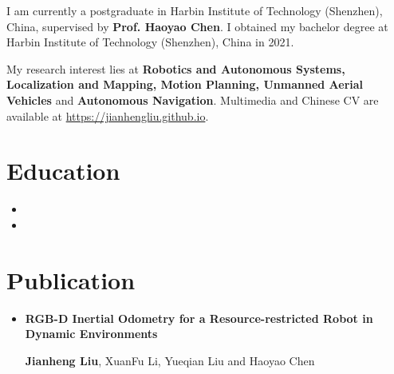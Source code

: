 \documentclass[11pt,a4paper,sans]{moderncv}        %
\begin{document}

\makecvtitle

\small{I am currently a postgraduate in Harbin Institute of Technology (Shenzhen), China, supervised by \textbf{Prof. Haoyao Chen}. I obtained my bachelor degree at Harbin Institute of Technology (Shenzhen), China in 2021.

My research interest lies at \textbf{Robotics and Autonomous Systems, Localization and Mapping, Motion Planning, Unmanned Aerial Vehicles} and \textbf{Autonomous Navigation}. Multimedia and Chinese CV are available at \href{https://jianhengliu.github.io}{https://jianhengliu.github.io}.

\section{Education}

\vspace{5pt}

\begin{itemize}

\item{}

\item{}

\end{itemize}

\vspace{2pt}

\section{Publication}

\vspace{5pt}

\begin{itemize}
    

\item{\textbf{RGB-D Inertial Odometry for a Resource-restricted Robot in Dynamic Environments}

\small{\textbf{Jianheng Liu}, XuanFu Li, Yueqian Liu and Haoyao Chen}

}
\end{itemize}}
\end{document}
